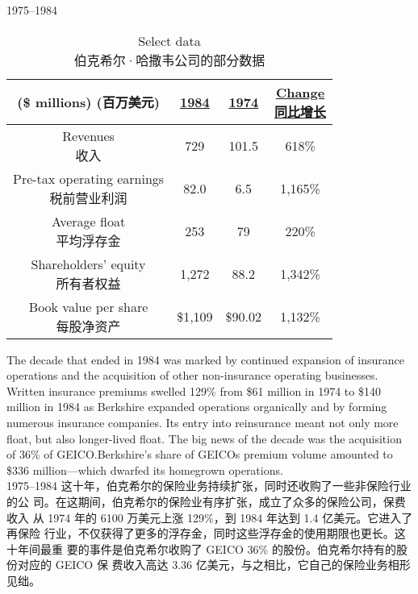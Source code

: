 \begin{section}{1975--1984}

\begin{table}[!htbp]
  \centering
  \begin{center}
    \begin{tabular}{cccc}
      \toprule
      \makecell[c]{(\$ millions) \\ (百万美元)} & \underline{1984} & \underline{1974} & \makecell[c]{\underline{Change} \\ \underline{同比增长}} \\
      \midrule
      \makecell[c]{Revenues \\ 收入} & 729 & 101.5 & 618\% \\
      \makecell[c]{Pre-tax operating earnings \\ 税前营业利润} & 82.0 & 6.5 & 1,165\% \\
      \makecell[c]{Average float \\ 平均浮存金} & 253 & 79 & 220\% \\
      \makecell[c]{Shareholders' equity \\ 所有者权益} & 1,272 & 88.2 & 1,342\% \\
      \makecell[c]{Book value per share \\ 每股净资产} & \$1,109 & \$90.02 & 1,132\% \\
      \bottomrule
    \end{tabular}
    \caption{Select data \\ 伯克希尔·哈撒韦公司的部分数据}
  \end{center}
\end{table}

\begin{verseparallel}
  {
    The decade that ended in 1984 was marked by continued expansion of insurance
    operations and the acquisition of other non-insurance operating businesses.
    Written insurance premiums swelled 129\% from \$61 million in 1974 to \$140
    million in 1984 as Berkshire expanded operations organically and by forming
    numerous insurance companies. Its entry into reinsurance meant not only more
    float, but also longer-lived float. The big news of the decade was the
    acquisition of 36\% of GEICO.\@ Berkshire's share of GEICOs premium volume
    amounted to \$336 million—which dwarfed its homegrown operations. \\
  }
  {
    1975--1984 这十年，伯克希尔的保险业务持续扩张，同时还收购了一些非保险行业的公
    司。在这期间，伯克希尔的保险业有序扩张，成立了众多的保险公司，保费收入
    从 1974 年的 6100 万美元上涨 129\%，到 1984 年达到 1.4 亿美元。它进入了再保险
    行业，不仅获得了更多的浮存金，同时这些浮存金的使用期限也更长。这十年间最重
    要的事件是伯克希尔收购了 GEICO 36\% 的股份。伯克希尔持有的股份对应的 GEICO 保
    费收入高达 3.36 亿美元，与之相比，它自己的保险业务相形见绌。
  }
\end{verseparallel}


\end{section}
